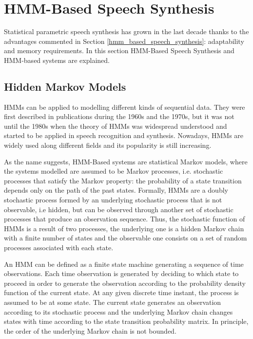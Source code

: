 \section{HMM-Based Speech Synthesis}
\label{hmm_synthesis}
Statistical parametric speech synthesis has grown in the last decade thanks to the advantages commented in Section \ref{hmm_based_speech_synthesis}: adaptability and memory requirements. In this section HMM-Based Speech Synthesis and HMM-based systems are explained.

\subsection{Hidden Markov Models}
\label{hmm_syntheis_markov}
HMMs can be applied to modelling different kinds of sequential data.
%
They were first described in publications during the 1960s and the 1970s, but it was not until the 1980s when the theory of HMMs was widespread understood and started to be applied in speech recognition and synthesis.
%
Nowadays, HMMs are widely used along different fields and its popularity is still increasing.

As the name suggests, HMM-Based systems are statistical Markov models, where the systems modelled are assumed to be Markov processes, i.e. stochastic processes that satisfy the Markov property: the probability of a state transition depends only on the path of the past states. 
%
Formally, HMMs are a doubly stochastic process formed by an underlying stochastic process that is not observable, i.e hidden, but can be observed through another set of stochastic processes that produce an observation sequence. 
%
Thus, the stochastic function of HMMs is a result of two processes, the underlying one is a hidden Markov chain with a finite number of states and the observable one consists on a set of random processes associated with each state.

An HMM can be defined as a finite state machine generating a sequence of time observations.
%
Each time observation is generated by deciding to which state to proceed in order to generate the observation according to the probability density function of the current state.
%
At any given discrete time instant, the process is assumed to be at some state.
%
The current state generates an observation according to its stochastic process and the underlying Markov chain changes states with time according to the state transition probability matrix. 
%
In principle, the order of the underlying Markov chain is not bounded.

